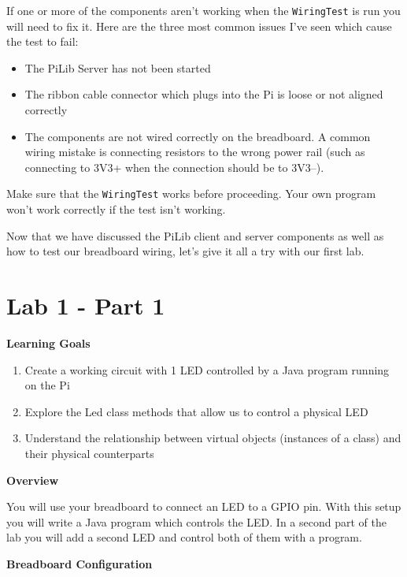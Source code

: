 If one or more of the components aren't working when the \texttt{WiringTest} is run you will need to fix it. Here are the three most common issues I've seen which cause the test to fail:

\begin{itemize}
	\item The PiLib Server has not been started
	\item The ribbon cable connector which plugs into the Pi is loose or not aligned correctly
	\item The components are not wired correctly on the breadboard. A common wiring mistake is connecting resistors to the wrong power rail (such as connecting to 3V3+ when the connection should be to 3V3--).
\end{itemize}

Make sure that the \texttt{WiringTest} works before proceeding. Your own program won't work correctly if the test isn't working.

Now that we have discussed the PiLib client and server components as well as how to test our breadboard wiring, let's give it all a try with our first lab.


\clearpage

\section{Lab 1 - Part 1}

\textbf{Learning Goals}

\begin{enumerate}
	\item Create a working circuit with 1 LED controlled by a Java program running on the Pi
	\item Explore the Led class methods that allow us to control a physical LED
	\item Understand the relationship between virtual objects (instances of a class) and their physical counterparts
\end{enumerate}

\textbf{Overview}

You will use your breadboard to connect an LED to a GPIO pin. With this setup you will write a Java program which controls the LED. In a second part of the lab you will add a second LED and control both of them with a program.

\textbf{Breadboard Configuration}

\hfill

{\centering
{}\par
}

